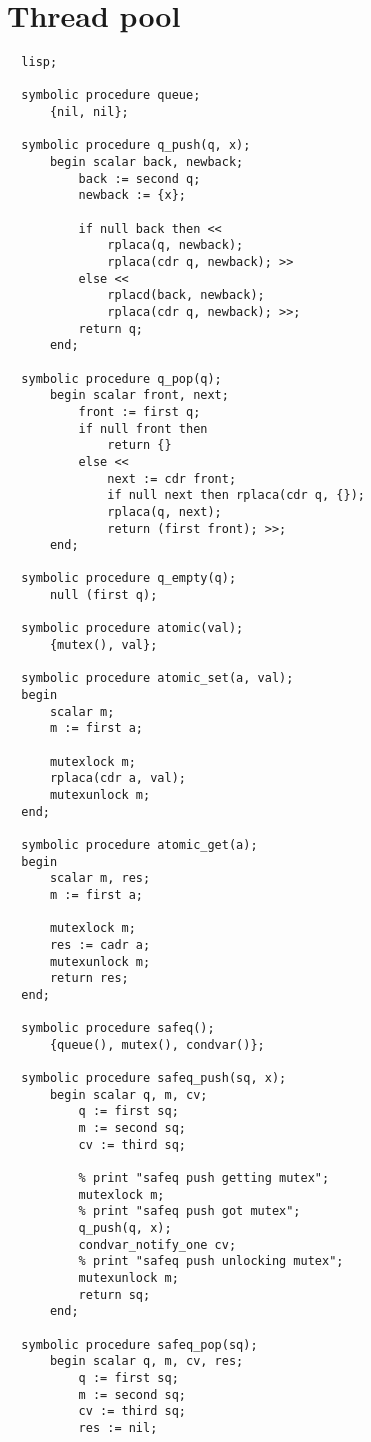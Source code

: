 \section{Thread pool}
\label{sec:threadpool-code}

\begin{verbatim}
  lisp;

  symbolic procedure queue;
      {nil, nil};

  symbolic procedure q_push(q, x);
      begin scalar back, newback;
          back := second q;
          newback := {x};

          if null back then <<
              rplaca(q, newback);
              rplaca(cdr q, newback); >>
          else <<
              rplacd(back, newback);
              rplaca(cdr q, newback); >>;
          return q;
      end;

  symbolic procedure q_pop(q);
      begin scalar front, next;
          front := first q;
          if null front then
              return {}
          else <<
              next := cdr front;
              if null next then rplaca(cdr q, {});
              rplaca(q, next);
              return (first front); >>;
      end;

  symbolic procedure q_empty(q);
      null (first q);

  symbolic procedure atomic(val);
      {mutex(), val};

  symbolic procedure atomic_set(a, val);
  begin
      scalar m;
      m := first a;

      mutexlock m;
      rplaca(cdr a, val);
      mutexunlock m;
  end;

  symbolic procedure atomic_get(a);
  begin
      scalar m, res;
      m := first a;

      mutexlock m;
      res := cadr a;
      mutexunlock m;
      return res;
  end;

  symbolic procedure safeq();
      {queue(), mutex(), condvar()};

  symbolic procedure safeq_push(sq, x);
      begin scalar q, m, cv;
          q := first sq;
          m := second sq;
          cv := third sq;

          % print "safeq push getting mutex";
          mutexlock m;
          % print "safeq push got mutex";
          q_push(q, x);
          condvar_notify_one cv;
          % print "safeq push unlocking mutex";
          mutexunlock m;
          return sq;
      end;

  symbolic procedure safeq_pop(sq);
      begin scalar q, m, cv, res;
          q := first sq;
          m := second sq;
          cv := third sq;
          res := nil;


\end{verbatim}
